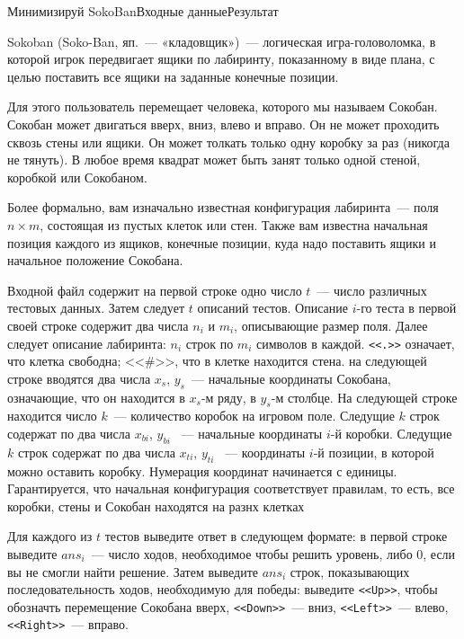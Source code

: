 

\begin{problem}{Минимизируй SokoBan}{Входные данные}{Результат}{}

Sokoban (Soko-Ban, яп.~--- «кладовщик»)~--- логическая игра-головоломка, в которой игрок передвигает ящики по лабиринту, показанному в виде плана, с целью поставить все ящики на заданные конечные позиции. 


Для этого пользователь перемещает человека, которого мы называем Сокобан. Сокобан может двигаться вверх, вниз, влево и вправо. Он не может проходить сквозь стены или ящики. Он может толкать только одну коробку за раз (никогда не тянуть). В любое время квадрат может быть занят только одной стеной, коробкой или Сокобаном.

Более формально, вам изначально известная конфигурация лабиринта~--- поля $n\times m$, состоящая из пустых клеток или стен. Также вам известна начальная позиция каждого из ящиков, конечные позиции, куда надо поставить ящики и начальное положение Сокобана.



\InputFile
Входной файл содержит на первой строке одно число $t$~--- число различных тестовых данных. Затем следует $t$ описаний тестов. Описание $i$-го теста в первой своей строке содержит два числа $n_i$ и $m_i$, описывающие размер поля. Далее следует описание лабиринта: $n_i$ строк по $m_i$ символов в каждой. \texttt{<<.>>} означает, что клетка свободна; $\texttt{<<\#>>}$, что в клетке находится стена. на следующей строке вводятся два числа $x_s$, $y_s$~--- начальные координаты Сокобана, означающие, что он находится в $x_s$-м ряду, в $y_s$-м столбце. На следующей строке находится число $k$~--- количество коробок на игровом поле. Следущие $k$ строк содержат по два числа $x_{bi}$, $y_{bi}$ ~--- начальные координаты $i$-й коробки.
Следущие $k$ строк содержат по два числа $x_{ti}$, $y_{ti}$ ~--- координаты $i$-й позиции, в которой можно оставить коробку.
Нумерация координат начинается с единицы. Гарантируется, что начальная конфигурация соответствует правилам, то есть, все коробки, стены и Сокобан находятся на разнх клетках

\OutputFile
Для каждого из $t$ тестов выведите ответ в следующем формате: в первой строке выведите $ans_i$~--- число ходов, необходимое чтобы решить уровень, либо 0, если вы не смогли найти решение. Затем выведите $ans_i$ строк, показывающих последовательность ходов, необходимую для победы: выведите \texttt{<<Up>>}, чтобы обозначть перемещение Сокобана вверх, \texttt{<<Down>>}~--- вниз, \texttt{<<Left>>}~--- влево, \texttt{<<Right>>}~--- вправо.



\end{problem}
